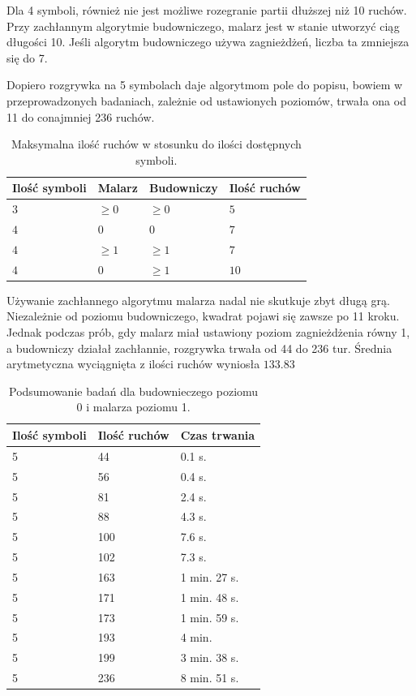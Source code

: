 \documentclass[document]{xmgr}
\begin{document}
Dla 4 symboli, również nie jest możliwe rozegranie partii dłuższej niż 10 ruchów. Przy zachłannym algorytmie budowniczego, malarz jest w stanie utworzyć ciąg długości 10. Jeśli algorytm budowniczego używa zagnieżdżeń, liczba ta zmniejsza się do 7.

Dopiero rozgrywka na 5 symbolach daje algorytmom pole do popisu, bowiem w przeprowadzonych badaniach, zależnie od ustawionych poziomów, trwała ona od 11 do conajmniej 236 ruchów.

\begin{table}[!h]
	\begin{tabular}{|l|l|l|l|} \hline
	Ilość symboli & Malarz & Budowniczy & Ilość ruchów \\ \hline
	$3$ & $\geq 0$ & $\geq 0$ & $5$\\ \hline
	$4$ & $0$ & $0$ & $7$\\ \hline
	$4$ & $\geq 1 $ & $\geq 1$ & $7$\\ \hline
	$4$ & $0$ & $\geq 1$ & $10$\\ \hline
	\end{tabular}
	\caption{Maksymalna ilość ruchów w stosunku do ilości dostępnych symboli.}
	\label{fig:maxGameLength}
\end{table}

\hfill \break
Używanie zachłannego algorytmu malarza nadal nie skutkuje zbyt długą grą. Niezależnie od poziomu budowniczego, kwadrat pojawi się zawsze po 11 kroku. Jednak podczas prób, gdy malarz miał ustawiony poziom zagnieżdżenia równy 1, a budowniczy działał zachłannie, rozgrywka trwała od 44 do 236 tur. Średnia arytmetyczna wyciągnięta z ilości ruchów wyniosła $133.83$

\begin{table}[!h]
	\begin{tabular}{|l|l|l|} \hline
	Ilość symboli & Ilość ruchów & Czas trwania \\ \hline
	5 & 44 & 0.1 s.\\ \hline
	5 & 56 & 0.4 s.\\ \hline
	5 & 81 & 2.4 s.\\ \hline
	5 & 88 & 4.3 s.\\ \hline
	5 & 100 & 7.6 s.\\ \hline
	5 & 102 & 7.3 s.\\ \hline
	5 & 163 & 1 min. 27 s. \\ \hline
	5 & 171 & 1 min. 48 s. \\ \hline
	5 & 173 & 1 min. 59 s. \\ \hline
	5 & 193 & 4 min. \\ \hline
	5 & 199 & 3 min. 38 s.\\ \hline
	5 & 236 & 8 min. 51 s. \\ \hline
	\end{tabular}
	\caption{Podsumowanie badań dla budownieczego poziomu 0 i malarza poziomu 1.}
	\label{fig:builder0Painter1Table}
\end{table}
\end{document}
